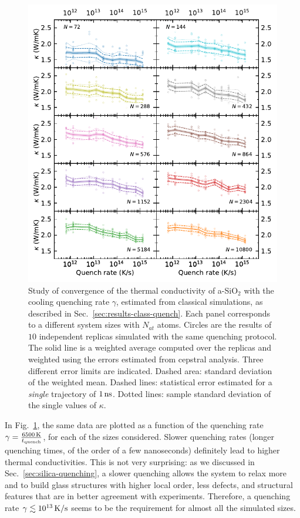 \begin{figure}[!tb]
    \centering
    \includegraphics[width=\textwidth]{chapters/chapter6/figures/Silica_NVT_kappa_QTIMEconv.pdf}
    \caption{Study of convergence of the thermal conductivity of a-SiO$_2$ with the cooling quenching rate $\gamma$, estimated from classical simulations, as described in Sec.~\ref{sec:results-class-quench}. 
    Each panel corresponds to a different system sizes with $N_{at}$ atoms.
    Circles are the results of $10$ independent replicas simulated with the same quenching protocol. The solid line is a weighted average computed over the replicas and weighted using the errors estimated from cepstral analysis. Three different error limits are indicated. 
    Dashed area: standard deviation of the weighted mean. 
    Dashed lines: statistical error estimated for a \emph{single} trajectory of $1\,\mathrm{ns}$. 
    Dotted lines: sample standard deviation of the single values of $\kappa$. 
    }
    \label{fig:results-class-kappa-vs-quench}
\end{figure}

In Fig.~\ref{fig:results-class-kappa-vs-quench}, the same data are plotted as a function of the quenching rate $\gamma = \frac{6500\,\mathrm{K}}{t_{\mathrm{quench}}}$, for each of the sizes considered. 
Slower quenching rates (longer quenching times, of the order of a few nanoseconds) definitely lead to higher thermal conductivities. 
This is not very surprising: as we discussed in Sec.~\ref{sec:silica-quenching}, a slower quenching allows the system to relax more and to build glass structures with higher local order, less defects, and structural features that are in better agreement with experiments. 
Therefore, a quenching rate $\gamma \lesssim 10^{13}\,\mathrm{K/s}$ seems to be the requirement for almost all the simulated sizes. 

